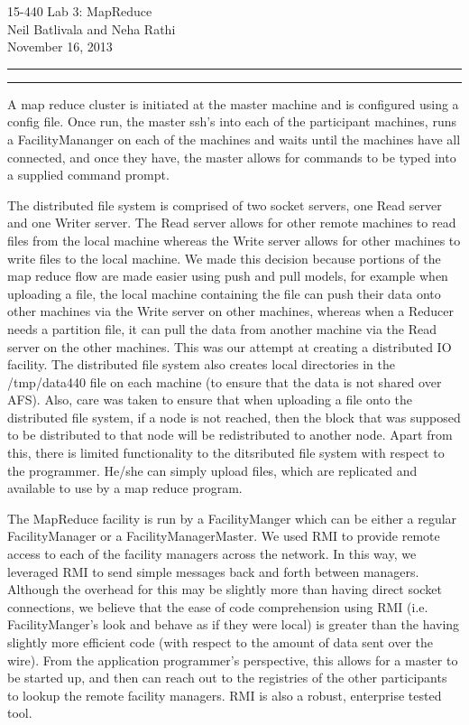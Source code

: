 \documentclass[11pt]{article}
\newcommand{\question}[2] {\vspace{.25in} \hrule\vspace{0.5em}
\noindent{\bf #1: #2} \vspace{0.5em}
\hrule \vspace{.10in}}
\begin{document}
\medskip

\thispagestyle{plain}
\begin{center}
{\Large 15-440 Lab 3: MapReduce} \\
Neil Batlivala and Neha Rathi \\
November 16, 2013 \\
\end{center}

\question{I} {Design}
A map reduce cluster is initiated at the master machine and is configured using a config file. Once run, the master ssh's into each of the participant machines, runs a FacilityMananger on each of the machines and waits until the machines have all connected, and once they have, the master allows for commands to be typed into a supplied command prompt.

The distributed file system is comprised of two socket servers, one Read server and one Writer server. The Read server allows for other remote machines to read files from the local machine whereas the Write server allows for other machines to write files to the local machine. We made this decision because portions of the map reduce flow are made easier using push and pull models, for example when uploading a file, the local machine containing the file can push their data onto other machines via the Write server on other machines, whereas when a Reducer needs a partition file, it can pull the data from another machine via the Read server on the other machines. This was our attempt at creating a distributed IO facility. The distributed file system also creates local directories in the /tmp/data440 file on each machine (to ensure that the data is not shared over AFS). Also, care was taken to ensure that when uploading a file onto the distributed file system, if a node is not reached, then the block that was supposed to be distributed to that node will be redistributed to another node. Apart from this, there is limited functionality to the ditsributed file system with respect to the programmer. He/she can simply upload files, which are replicated and available to use by a map reduce program. 

The MapReduce facility is run by a FacilityManger which can be either a regular FacilityManager or a FacilityManagerMaster. We used RMI to provide remote access to each of the facility managers across the network. In this way, we leveraged RMI to send simple messages back and forth between managers. Although the overhead for this may be slightly more than having direct socket connections, we believe that the ease of code comprehension using RMI (i.e. FacilityManger's look and behave as if they were local) is greater than the having slightly more efficient code (with respect to the amount of data sent over the wire). From the application programmer's perspective, this allows for a master to be started up, and then can reach out to the registries of the other participants to lookup the remote facility managers. RMI is also a robust, enterprise tested tool. 
\end{document}

